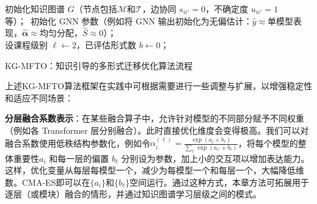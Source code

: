 \documentclass[../main.tex]{subfiles}
\begin{document}
\begin{algorithm}[tb]
	\small
	\DontPrintSemicolon
	初始化知识图谱 $G$（节点包括$\mathcal{M}$和$\mathcal{T}$，边协同 $s_{ii'}=0$，不确定度 $u_{ii'}=1$ 等）；\ 初始化 GNN 参数（例如将 GNN 输出初始化为无偏估计：$\hat{y}\approx$单模型表现，$\hat{\boldsymbol{\alpha}}\approx$均匀分配，$\hat{S}\approx 0$）；\\
	设课程级别 $\ell\leftarrow 2$，已评估形式数 $b\leftarrow 0$；\\
	\caption{KG-MFTO：知识引导的多形式迁移优化算法流程}
	\label{alg:kg-mfto}
\end{algorithm}

上述KG-MFTO算法框架在实践中可根据需要进行一些调整与扩展，以增强稳定性和适应不同场景：

\textbf{分层融合系数表示}：在某些融合算子中，允许针对模型的不同部分赋予不同权重（例如各 Transformer 层分别融合）。此时直接优化维度会变得极高。我们可以对融合系数使用低秩结构参数化，例如令$\alpha^{(\ell)}_i = \frac{\exp(a_i + b_\ell)}{\sum_{i'} \exp(a_{i'} + b_\ell)}$，将每个模型的整体重要性$ a_i$ 和每一层的偏置 $b_\ell$ 分别设为参数，加上小的交互项以增加表达能力。这样，优化变量从每层每模型一个，减少为每模型一个和每层一个，大幅降低维数。CMA-ES即可以在$\{a_i\}$和$\{b_\ell\}$空间运行。通过这种方式，本章方法可拓展用于逐层（或模块）融合的情形，并通过知识图谱学习层级之间的模式。
\end{document}
